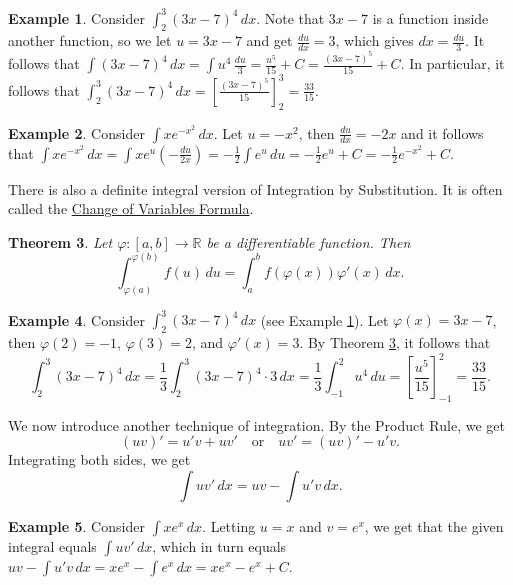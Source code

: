 \documentclass[12pt,letterpaper]{book}
\numberwithin{equation}{section}
\newtheorem{thm}{\textbf{Theorem}}[section]
\theoremstyle{definition}
\newtheorem{example}[thm]{\textbf{Example}}
\begin{document}
\begin{example}\label{defintbysub} Consider $\displaystyle{\int_{2}^3 (3x-7)^4\,dx}$. Note that $3x-7$ is a function inside another function, so we let $u=3x-7$ and get $\frac{du}{dx}=3$, which gives $dx=\frac{du}{3}$. It follows that $\displaystyle{\int (3x-7)^4\,dx=\int u^4 \,\frac{du}{3}=\frac{u^5}{15}+C=\frac{(3x-7)^5}{15}+C}$. In particular, it follows that $\displaystyle{\int_{2}^3 (3x-7)^4\,dx=\left[\frac{(3x-7)^5}{15}\right]_{2}^3=\frac{33}{15}}$.
\end{example}

\begin{example}\label{xexsquare}
Consider $\displaystyle{\int xe^{-x^2}\,dx}$. Let $u=-x^2$, then $\frac{du}{dx}=-2x$ and it follows that $\displaystyle{\int xe^{-x^2}\,dx=\int xe^u\left(-\frac{du}{2x}\right)=-\frac{1}{2}\int e^u\,du=-\frac{1}{2}e^u+C=-\frac{1}{2}e^{-x^2}+C}$.
\end{example}

There is also a definite integral version of Integration by Substitution. It is often called the \underline{Change of Variables Formula}.

\begin{thm} \label{1dcov}
Let $\varphi:[a,b]\to \mathbb{R}$ be a differentiable function. Then
$$\int_{\varphi(a)}^{\varphi(b)}f(u)\,du=\int_a^b f(\varphi(x))\varphi'(x)\,dx.$$
\end{thm}

\begin{example}
Consider $\displaystyle{\int_{2}^3 (3x-7)^4\,dx}$ (see Example \ref{defintbysub}). Let $\varphi(x)=3x-7$, then $\varphi(2)=-1$, $\varphi(3)=2$, and $\varphi'(x)=3$. By Theorem \ref{1dcov}, it follows that
$$\int_{2}^3 (3x-7)^4\,dx=\frac{1}{3}\int_{2}^3 (3x-7)^4\cdot 3\,dx=\frac{1}{3}\int_{-1}^2 u^4\,du=\left[\frac{u^5}{15}\right]_{-1}^2=\frac{33}{15}.$$
\end{example}

We now introduce another technique of integration. By the Product Rule, we get
$$(uv)'=u'v+uv'\quad\text{or}\quad uv'=(uv)'-u'v.$$
Integrating both sides, we get
$$\int uv'\,dx=uv-\int u'v\,dx.$$

\begin{example} Consider $\displaystyle{\int xe^x\,dx}$. Letting $u=x$ and $v=e^x$, we get that the given integral equals $\displaystyle{\int uv'\,dx}$, which in turn equals $uv-\displaystyle{\int u'v\,dx=xe^x-\int e^x\,dx=xe^x-e^x+C}$.
\end{example}
\end{document}
